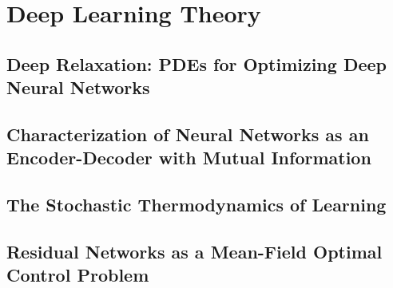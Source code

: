 \chapter{Deep Learning Theory}
\cite{blackbox} \cite{deeprelaxation} \cite{meanfield}

\section{Deep Relaxation: PDEs for Optimizing Deep Neural Networks}
\section{Characterization of Neural Networks as an Encoder-Decoder with Mutual Information}
\section{The Stochastic Thermodynamics of Learning}
\section{Residual Networks as a Mean-Field Optimal Control Problem}
